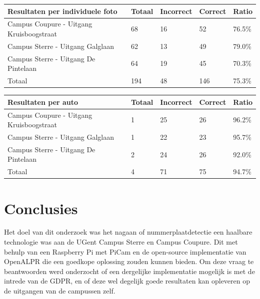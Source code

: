 \documentclass[a0,portrait]{a0poster}
\begin{document}
\begin{multicols}{2}
\begin{center}
	\centering
	\begin{tabular}{l|l|l|l|l}
		\textbf{Resultaten per individuele foto}	& \textbf{Totaal}	& \textbf{Incorrect} & \textbf{Correct} & \textbf{Ratio} \\ \hline
		Campus Coupure - Uitgang Kruisboogstraat  & 68 & 16 & 52 & 76.5\% \\
		Campus Sterre - Uitgang Galglaan 		  & 62& 13 & 49 & 79.0\%\\
		Campus Sterre - Uitgang De Pintelaan	  & 64& 19 & 45 & 70.3\%\\ \hline
		Totaal 									  & 194& 48 & 146 & 75.3\%
	\end{tabular}
\end{center}

\begin{center}
	\centering
	\begin{tabular}{l|l|l|l|l}
		\textbf{Resultaten per auto}	& \textbf{Totaal}	& \textbf{Incorrect} & \textbf{Correct} & \textbf{Ratio} \\ \hline
		Campus Coupure - Uitgang Kruisboogstraat& 1 & 25  & 26 & 96.2\% \\
		Campus Sterre - Uitgang Galglaan		& 1 & 22  & 23 & 95.7\%\\
		Campus Sterre - Uitgang De Pintelaan	& 2 & 24  & 26 & 92.0\%\\ \hline
		Totaal 									& 4 & 71 & 75 & 94.7\%
	\end{tabular}
\end{center}







\color{HoGentAccent1} 
\section*{Conclusies}
\color{black}
Het doel van dit onderzoek was het nagaan of nummerplaatdetectie een haalbare technologie was aan de UGent Campus Sterre en Campus Coupure. Dit met behulp van een Raspberry Pi met PiCam en de open-source implementatie van OpenALPR die een goedkope oplossing zouden kunnen bieden. Om deze vraag te beantwoorden werd onderzocht of een dergelijke implementatie mogelijk is met de intrede van de GDPR, en of deze wel degelijk goede resultaten kan opleveren op de uitgangen van de campussen zelf.


\end{multicols}
\end{document}
